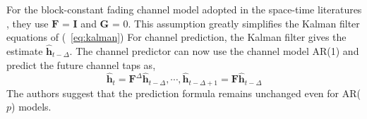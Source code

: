 For the block-constant fading channel model adopted in the space-time literatures \cite{nambipaper}, they use $\boldsymbol{F}$ = $\boldsymbol{I}$ and $\boldsymbol{G}$ = 0. This assumption greatly simplifies the Kalman filter equations of (~\ref{eq:kalman})
For channel prediction, the Kalman filter gives the estimate $ \hat{\boldsymbol{h}} _{t-\Delta} $. The channel predictor can now use the channel model AR(1) and predict the future channel taps as,
\begin{equation}
\hat{\boldsymbol{h}} _{t} = \boldsymbol{F} ^{\Delta} \hat{\boldsymbol{h}} _{t-\Delta} , \cdots , \hat{\boldsymbol{h}} _{t-\Delta+1} = \boldsymbol{F} \hat{\boldsymbol{h}} _{t-\Delta}
\end{equation}
The authors suggest that the prediction formula remains unchanged even for AR($p$) models. 


